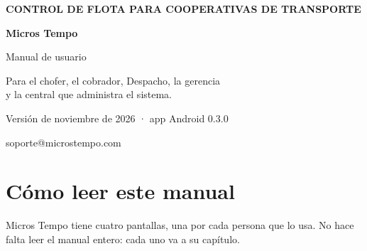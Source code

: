 \documentclass[11pt,a4paper,oneside]{book}
\begin{document}
\frontmatter

\begin{titlepage}
  \pagecolor{tinta}\color{white}
  \vspace*{5.5cm}
  \hspace*{2.4cm}\begin{minipage}{0.75\paperwidth}
    {\large\color{marca!45!white}\bfseries CONTROL DE FLOTA PARA COOPERATIVAS DE TRANSPORTE}\par\vspace{14pt}
    {\fontsize{46}{50}\selectfont\bfseries Micros Tempo}\par\vspace{10pt}
    {\fontsize{24}{28}\selectfont Manual de usuario}\par\vspace{28pt}
    {\large Para el chofer, el cobrador, Despacho, la gerencia\\y la central que administra el sistema.}\par
    \vspace{5.5cm}
    {\color{marca!45!white}Versión de noviembre de 2026 · app Android 0.3.0}\par\vspace{4pt}
    {\color{marca!45!white}soporte@microstempo.com}
  \end{minipage}
  \restoregeometry
\end{titlepage}
\nopagecolor\color{tinta}

\chapter*{Cómo leer este manual}

Micros Tempo tiene cuatro pantallas, una por cada persona que lo usa. No hace
falta leer el manual entero: cada uno va a su capítulo.
\end{document}
